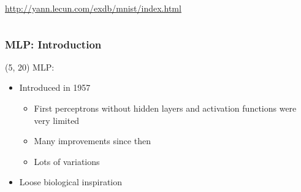 \begin{frame}
\begin{columns}
\begin{column}{0.5\textwidth}
      \url{http://yann.lecun.com/exdb/mnist/index.html}
    \end{column}
  \end{columns}
\end{frame}

\begin{frame}
  \frametitle{\acl{MLP}: Introduction}

  \begin{textblock}{80}(5, 20)
    \acl{MLP}:
    \begin{itemize}
    \item<1-> Introduced in 1957
      \begin{itemize}
      \item First perceptrons without hidden layers and activation functions were
        very limited
      \item Many improvements since then
      \item Lots of variations
      \end{itemize}
    \item<1-> Loose biological inspiration
    \end{itemize}
  \end{textblock}
\end{frame}

